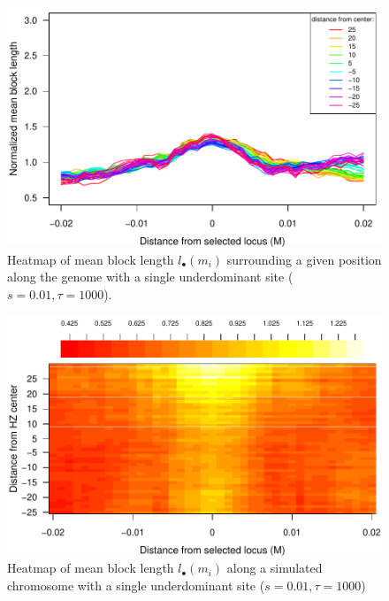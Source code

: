 \begin{figure}
\includegraphics{figs/blocksAlongChromNoConditioning}
\caption{Heatmap of mean block length $l_\bullet(m_i)$ surrounding a given position along the genome with a single underdominant site ($s=0.01, \tau=1000$). }\label{Supp:blockLengthNoAnc}
\end{figure}

\begin{figure}
\includegraphics{figs/blocksAlongChromHeatmap}
\caption{Heatmap of mean block length $l_\bullet(m_i)$ along a simulated chromosome with a single underdominant site ($s=0.01, \tau=1000$) }\label{Supp:blockLengthHeatmapNoAnc}
\end{figure}


